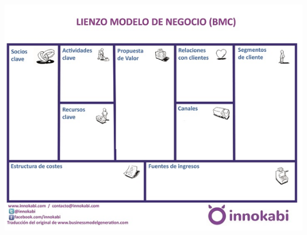 \begin{enumerate}[1.]
\begin{enumerate}[a)]
		\begin{center}
                    \includegraphics[scale=0.60]{./Imagenes/ang_1}
                    \end{center}



\end{enumerate}
\end{enumerate}
